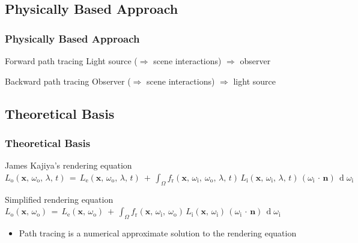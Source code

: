 \documentclass{beamer}
\begin{document}
\subsection{Physically Based Approach}
\begin{frame}
    \frametitle{Physically Based Approach}
    \begin{block}{Forward path tracing}
        Light source (\(\Rightarrow\) scene interactions) \(\Rightarrow\) observer
    \end{block}
    \begin{block}{Backward path tracing}
        Observer (\(\Rightarrow\) scene interactions) \(\Rightarrow\) light source
    \end{block}
\end{frame}

\subsection{Theoretical Basis}
\begin{frame}
    \frametitle{Theoretical Basis}
    \begin{block}{James Kajiya's rendering equation}
        \scriptsize
        \(
            L_{\text{o}}(\mathbf x,\, \omega_{\text{o}},\, \lambda,\, t) \,=
            \, L_{\text{e}}(\mathbf x,\, \omega_{\text{o}},\, \lambda,\, t) \ +
            \, \int_\Omega f_{\text{r}}(\mathbf x,\, \omega_{\text{i}},\ \omega_{\text{o}},\, \lambda,\, t)
            \, L_{\text{i}}(\mathbf x,\, \omega_{\text{i}},\, \lambda,\, t)\,
            (\omega_{\text{i}}\,\cdot\,\mathbf n)\, \operatorname d \omega_{\text{i}}
        \)
    \end{block}
    \begin{block}{Simplified rendering equation}
        \(
            L_{\text{o}}(\mathbf x,\, \omega_{\text{o}}) \,=
            \, L_{\text{e}}(\mathbf x,\, \omega_{\text{o}}) \ +
            \, \int_\Omega f_{\text{r}}(\mathbf x,\, \omega_{\text{i}},\ \omega_{\text{o}})
            \, L_{\text{i}}(\mathbf x,\, \omega_{\text{i}})\,
            (\omega_{\text{i}}\,\cdot\,\mathbf n)\, \operatorname d \omega_{\text{i}}
        \)
    \end{block}

    \begin{itemize}
        \item Path tracing is a numerical approximate solution to the rendering equation
    \end{itemize}
\end{frame}
\end{document}
